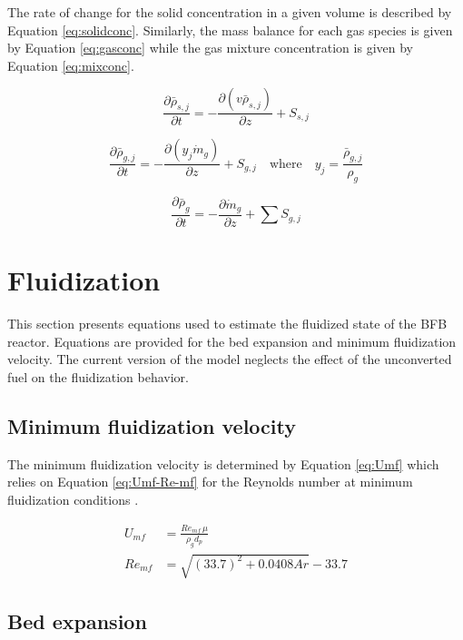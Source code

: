\documentclass[12pt,titlepage]{article}
\begin{document}
The rate of change for the solid concentration in a given volume is described by Equation \ref{eq:solidconc}. Similarly, the mass balance for each gas species is given by Equation \ref{eq:gasconc} while the gas mixture concentration is given by Equation \ref{eq:mixconc}.

\begin{equation} \label{eq:solidconc}
    \frac{\partial \bar\rho_{s,j}}{\partial t} = -\frac{\partial (v \bar\rho_{s,j})}{\partial z} + S_{s,j}
\end{equation}

\begin{equation} \label{eq:gasconc}
    \frac{\partial \bar\rho_{g,j}}{\partial t} = -\frac{\partial (y_j \dot m_g)}{\partial z} + S_{g,j} \quad \text{where} \quad y_j = \frac{\bar\rho_{g,j}}{\rho_g}
\end{equation}

\begin{equation} \label{eq:mixconc}
    \frac{\partial \bar\rho_g}{\partial t} = -\frac{\partial \dot m_g}{\partial z} + \sum S_{g,j}
\end{equation}

\section{Fluidization}

This section presents equations used to estimate the fluidized state of the BFB reactor. Equations are provided for the bed expansion and minimum fluidization velocity. The current version of the model neglects the effect of the unconverted fuel on the fluidization behavior.

\subsection{Minimum fluidization velocity}

The minimum fluidization velocity is determined by Equation \ref{eq:Umf} which relies on Equation \ref{eq:Umf-Re-mf} for the Reynolds number at minimum fluidization conditions \cite{Wen-1966}.

\begin{align}
    U_{mf} &= \frac{Re_{mf}\,\mu}{\rho_g d_p} \label{eq:Umf} \\
    Re_{mf} &= \sqrt{(33.7)^2 + 0.0408 Ar} - 33.7 \label{eq:Umf-Re-mf}
\end{align}

\subsection{Bed expansion}
\end{document}
